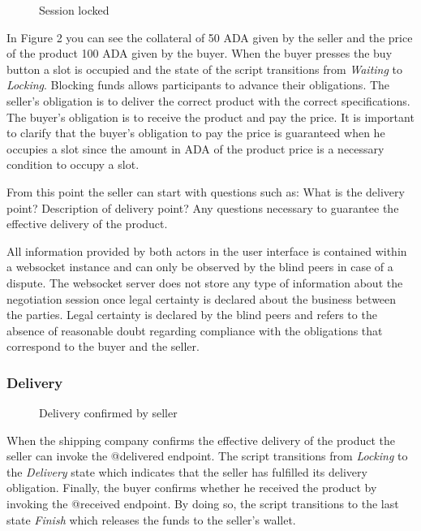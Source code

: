 \documentclass[12pt]{article}
\begin{document}
\begin{figure}[ht]
  \centering
  
  \caption{Session locked}
  \label{fig:locking}
\end{figure}


In Figure 2 you can see the collateral of 50 ADA given by the seller and the price of the product 100 ADA given by the buyer.
When the buyer presses the buy button a slot is occupied and the state of the script transitions from \emph{Waiting} to \emph{Locking}.
Blocking funds allows participants to advance their obligations.
The seller's obligation is to deliver the correct product with the correct specifications. The buyer's obligation is to receive the product and pay the price.
It is important to clarify that the buyer's obligation to pay the price is guaranteed when he occupies a slot since the amount in ADA of the product price is a necessary condition to occupy a slot.

From this point the seller can start with questions such as: What is the delivery point? Description of delivery point? Any questions necessary to guarantee the effective delivery of the product.

All information provided by both actors in the user interface is contained within a websocket instance and can only be observed by the blind peers in case of a dispute.
The websocket server does not store any type of information about the negotiation session once legal certainty is declared about the business between the parties.
Legal certainty is declared by the blind peers and refers to the absence of reasonable doubt regarding compliance with the obligations that correspond to the buyer and the seller.


\subsubsection { Delivery }


\begin{figure}[ht]
  \centering
  
  \caption{Delivery confirmed by seller}  
  \label{fig:delivered}
\end{figure}



When the shipping company confirms the effective delivery of the product the seller can invoke the @delivered endpoint.
The script transitions from \emph{Locking} to the \emph{Delivery} state which indicates that the seller has fulfilled its delivery obligation.
Finally, the buyer confirms whether he received the product by invoking the @received endpoint. By doing so, the script transitions to the last state \emph{Finish} which releases the funds to the seller's wallet.
\end{document}

